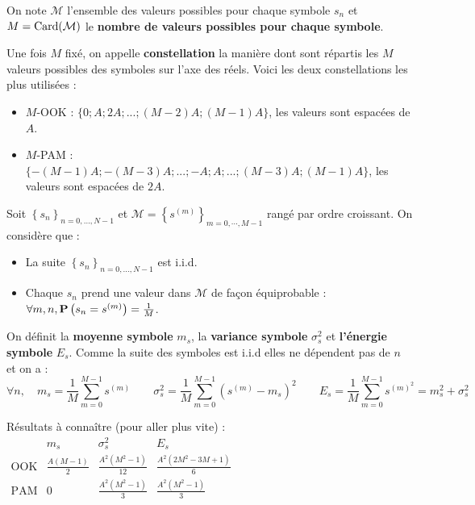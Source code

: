 	\begin{defn}
	On note $\mathcal{M}$ l'ensemble des valeurs possibles pour chaque symbole $s_{n}$ et \textbf{$M = \operatorname{Card}(\mathcal{M})$} le \textbf{nombre de valeurs possibles pour chaque symbole}.

	Une fois \textbf{$M$} fixé, on appelle \textbf{constellation} la manière dont sont répartis les \textbf{$M$} valeurs possibles des symboles sur l'axe des réels.
	Voici les deux constellations les plus utilisées :
		\begin{itemize}
		\item $M$-OOK : $\{0;A;2A;...;(M-2)A;(M-1)A\}$, les valeurs sont espacées de $A$.
		\item $M$-PAM : $\{-(M-1)A;-(M-3)A;...;-A;A;...;(M-3)A;(M-1)A\}$, les valeurs sont espacées de $2A$.
		\end{itemize}
	\end{defn}

	\begin{hyp}
	Soit $\left\{ s_n \right\}_{n = 0,\ldots,N - 1}$ et $\mathcal{M} = \left\{ s^{(m)} \right\}_{m=0,\cdots,M-1}$ rangé par ordre croissant. On considère que :
	\begin{itemize}
		\item[\textbullet] La suite $\left\{ s_n \right\}_{n = 0,\ldots,N - 1}$ est i.i.d.
		\item[\textbullet] Chaque $s_n$ prend une valeur dans $\mathcal{M}$ de façon équiprobable :
			$\forall m,n, \mathbf{P} \left( s_n = s^{(m)} \right) = \frac{1}{M}$.
	\end{itemize}
	On définit la \textbf{moyenne symbole} $m_{s}$, la \textbf{variance symbole} $\sigma^{2}_{s}$ et \textbf{l'énergie symbole} $E_{s}$.
	Comme la suite des symboles est i.i.d elles ne dépendent pas de $n$ et on a :
	$$\forall n, \quad m_{s} = \frac{1}{M} \sum_{m = 0}^{M - 1} s^{(m)} \qquad
		\sigma^2_{s} = \frac{1}{M} \sum_{m = 0}^{M-1}(s^{(m)} - m_{s})^2 \qquad
		E_{s} = \frac{1}{M} \sum_{m = 0}^{M - 1} s^{(m)^2} = m_s^2 + \sigma_s^2$$
	\end{hyp}

	\begin{pop}
		Résultats à connaître (pour aller plus vite) :
		$\begin{array}{c|ccc}
		           & m_s                & \sigma_s^2               & E_s \\ \hline
		\text{OOK} & \frac{A(M - 1)}{2} & \frac{A^2 (M^2 - 1)}{12} & \frac{A^2(2M^2 - 3M + 1)}{6} \\
		\text{PAM} & 0                  & \frac{A^2 (M^2 - 1)}{3}  & \frac{A^{2}(M^{2}-1)}{3}
		\end{array}$
	\end{pop}

